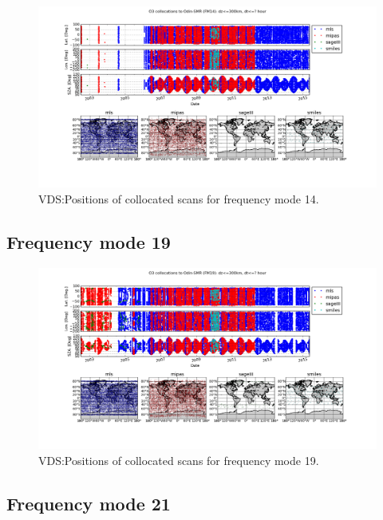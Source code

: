 \begin{figure}[t]
\centering
\includegraphics[width=17cm]{test_collocation_fm14.png}
\caption{VDS:Positions of collocated scans for frequency mode 14.}
\label{fig:vdsfm14}
\end{figure}

\clearpage
\newpage

\subsection{Frequency mode 19}

\begin{figure}[t]
\centering
\includegraphics[width=17cm]{test_collocation_fm19.png}
\caption{VDS:Positions of collocated scans for frequency mode 19.}
\label{fig:vdsfm19}
\end{figure}

\clearpage
\newpage

\subsection{Frequency mode 21}

